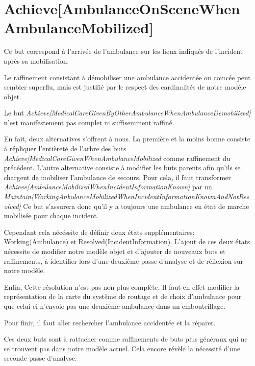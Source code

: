 \section{Achieve[AmbulanceOnSceneWhenAmbulanceMobilized]}
	Ce but correspond à l'arrivée de l'ambulance sur les lieux indiqués
	de l'incident après sa mobilisation.
	
	Le raffinement consistant à démobiliser une ambulance accidentée ou
	coincée peut sembler superflu, mais est justifié par le respect des
	cardinalités de notre modèle objet. 

	Le but \emph{Achieve[MedicalCareGivenByOtherAmbulanceWhenAmbulanceDemobilized]}
	n'est manifestement pas complet ni suffisemment raffiné.
	
	En fait, deux alternatives s'offrent à nous. La première et la moins bonne
	consiste à répliquer l'entièreté de l'arbre des buts \emph{Achieve[MedicalCareGivenWhenAmbulanceMobilized}
	comme raffinement du précédent. L'autre alternative consiste à modifier
	les buts parents afin qu'ils se chargent de mobiliser l'ambulance de 
	secours. Pour cela, il faut transformer \emph{Achieve[AmbulanceMobilizedWhenIncidentInformationKnown]}
	par un \emph{Maintain[WorkingAnbulanceMobilizedWhenIncidentInformationKnownAndNotResolved]}
	Ce but s'assurera donc qu'il y a toujours une ambulance en état de marche 
	mobilisée pour chaque incident. 
	
	Cependant cela nécéssite de définir deux états supplémentaires:  
	Working(Ambulance) et Resolved(IncidentInformation). L'ajout de ces deux
	états nécessite de modifier notre modèle objet et d'ajouter de nouveaux 
	buts et raffinements, à identifier lors d'une deuxième passe d'analyse
	et de réflexion sur notre modêle.

	Enfin, Cette résolution n'est pas non plus complète. Il faut en effet
	modifier la représentation de la carte du systême de routage et de choix
	d'ambulance pour que celui ci n'envoie pas une deuxième ambulance dans
	un embouteillage. 

	Pour finir, il faut aller rechercher l'ambulance accidentée et la 
	réparer. 

	Ces deux buts sont à rattacher comme raffinements de buts plus généraux
	qui ne se trouvent pas dans notre modèle actuel. Cela encore révèle la
	nécessité d'une seconde passe d'analyse.

